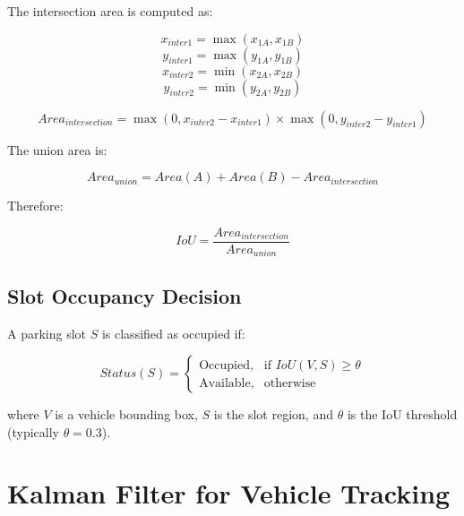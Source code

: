 \documentclass[12pt,a4paper]{report}
\begin{document}
The intersection area is computed as:

\begin{equation}
x_{inter1} = \max(x_{1A}, x_{1B})
\end{equation}
\begin{equation}
y_{inter1} = \max(y_{1A}, y_{1B})
\end{equation}
\begin{equation}
x_{inter2} = \min(x_{2A}, x_{2B})
\end{equation}
\begin{equation}
y_{inter2} = \min(y_{2A}, y_{2B})
\end{equation}

\begin{equation}
Area_{intersection} = \max(0, x_{inter2} - x_{inter1}) \times \max(0, y_{inter2} - y_{inter1})
\end{equation}

The union area is:

\begin{equation}
Area_{union} = Area(A) + Area(B) - Area_{intersection}
\end{equation}

Therefore:

\begin{equation}
IoU = \frac{Area_{intersection}}{Area_{union}}
\end{equation}

\subsection{Slot Occupancy Decision}

A parking slot $S$ is classified as occupied if:

\begin{equation}
Status(S) =
\begin{cases}
\text{Occupied}, & \text{if } IoU(V, S) \geq \theta \\
\text{Available}, & \text{otherwise}
\end{cases}
\end{equation}

where $V$ is a vehicle bounding box, $S$ is the slot region, and $\theta$ is the IoU threshold (typically $\theta = 0.3$).


\section{Kalman Filter for Vehicle Tracking}
\end{document}
